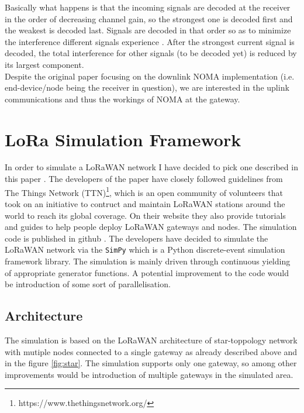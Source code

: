 Basically what happens is that the incoming signals are decoded at the receiver in the order of decreasing channel gain, so the  strongest one is decoded first and the weakest is decoded last. Signals are decoded in that order so as to minimize the interference different signals experience \cite{noma_imperial}. After the strongest current signal is decoded, the total interference for other signals (to be decoded yet) is reduced by its largest component.\\

Despite the original paper \cite{noma_original} focusing on the downlink NOMA
implementation (i.e. end-device/node being the receiver in question), we are interested in the uplink communications and thus the workings of NOMA at the gateway. 
  
 
 
\section{LoRa Simulation Framework}

In order to simulate a LoRaWAN network I have decided to pick one described in this paper \cite{simulator}. The developers of the paper have closely followed guidelines from The Things Network (TTN)\footnote{https://www.thethingsnetwork.org/}, which is an open community of volunteers that took on an initiative to contruct and maintain LoRaWAN stations around the world to reach its global coverage. On their website they also provide tutorials and guides to help people deploy LoRaWAN gateways and nodes. The simulation code is published in github \cite{simulator_github}. The developers have decided to simulate the LoRaWAN network via the \texttt{SimPy} which is a Python discrete-event simulation framework library\cite{simpy}. The simulation is mainly driven through continuous yielding of appropriate generator functions. A potential improvement to the code would be introduction of some sort of parallelisation.

\subsection{Architecture}

The simulation is based on the LoRaWAN architecture of star-toppology network with mutiple nodes connected to a single gateway as already described above and in the figure \ref{fig:star}. The simulation supports only one gateway, so among other improvements would be introduction of multiple gateways in the simulated area. \\

